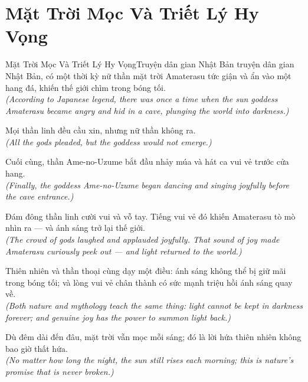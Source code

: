 \section{Mặt Trời Mọc Và Triết Lý Hy Vọng}
\begin{truyen}{Mặt Trời Mọc Và Triết Lý Hy Vọng}{Truyện dân gian Nhật Bản}
 truyện dân gian Nhật Bản, có một thời kỳ nữ thần mặt trời Amaterasu tức giận và ẩn vào một hang đá, khiến thế giới chìm trong bóng tối.\\[4pt]
\textit{(According to Japanese legend, there was once a time when the sun goddess Amaterasu became angry and hid in a cave, plunging the world into darkness.)}

Mọi thần linh đều cầu xin, nhưng nữ thần không ra.\\[4pt]
\textit{(All the gods pleaded, but the goddess would not emerge.)}

Cuối cùng, thần Ame-no-Uzume bắt đầu nhảy múa và hát ca vui vẻ trước cửa hang.\\[4pt]
\textit{(Finally, the goddess Ame-no-Uzume began dancing and singing joyfully before the cave entrance.)}

Đám đông thần linh cười vui và vỗ tay. Tiếng vui vẻ đó khiến Amaterasu tò mò nhìn ra --- và ánh sáng trở lại thế giới.\\[4pt]
\textit{(The crowd of gods laughed and applauded joyfully. That sound of joy made Amaterasu curiously peek out --- and light returned to the world.)}

Thiên nhiên và thần thoại cùng dạy một điều: ánh sáng không thể bị giữ mãi trong bóng tối; và lòng vui vẻ chân thành có sức mạnh triệu hồi ánh sáng quay về.\\[4pt]
\textit{(Both nature and mythology teach the same thing: light cannot be kept in darkness forever; and genuine joy has the power to summon light back.)}

\end{truyen}
\begin{baihoc}
  Dù đêm dài đến đâu, mặt trời vẫn mọc mỗi sáng; đó là lời hứa thiên nhiên không bao giờ thất hứa.\\[4pt]
  \textit{(No matter how long the night, the sun still rises each morning; this is nature's promise that is never broken.)}
\end{baihoc}

